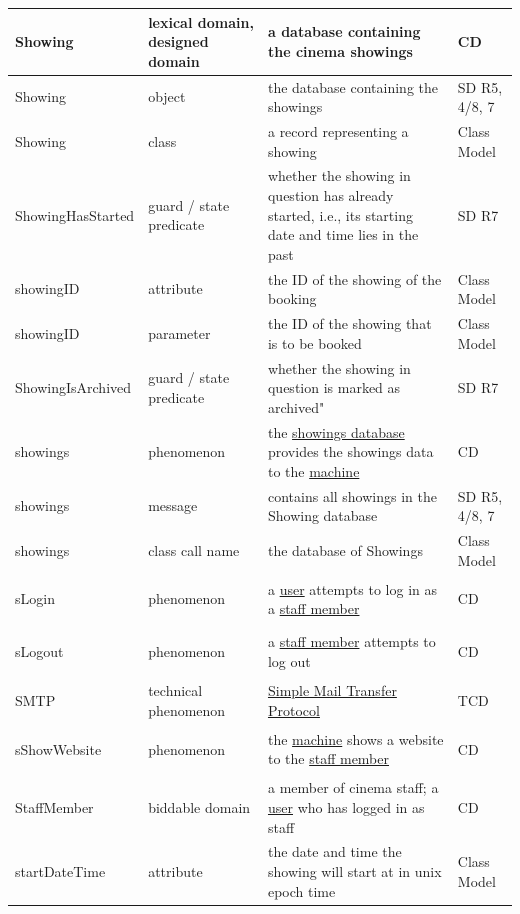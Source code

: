 \documentclass[a4paper,10pt,titlepage,bibtotoc,bibtotocnumbered]{scrreprt}
\begin{document}
\begin{longtable}{|p{4cm}|p{3cm}|p{5cm}|l|}
\hline
\hypertarget{glossary:Showing}{Showing} & lexical domain, designed domain & a database containing the cinema showings & CD\\
\hline
Showing & object & the database containing the showings & SD R5, 4/8, 7\\
\hline
Showing & class & a record representing a showing & Class Model\\
\hline
ShowingHasStarted & guard / state predicate & whether the showing in question has already started, i.e., its starting date and time lies in the past & SD R7\\
\hline
showingID & attribute & the ID of the showing of the booking & Class Model\\
\hline
showingID & parameter & the ID of the showing that is to be booked & Class Model\\
\hline
ShowingIsArchived & guard / state predicate & whether the showing in question is marked as archived" & SD R7\\
\hline
\hypertarget{glossary:showings}{showings} & phenomenon & the \hyperlink{glossary:Showing}{showings database} provides the showings data to the \hyperlink{glossary:UDEKino}{machine} & CD\\
\hline
showings & message & contains all showings in the Showing database & SD R5, 4/8, 7\\
\hline
showings & class call name & the database of Showings & Class Model\\
\hypertarget{glossary:sLogin}{sLogin} & phenomenon & a \hyperlink{glossary:User}{user} attempts to log in as a \hyperlink{glossary:StaffMember}{staff member} & CD\\
\hline
\hypertarget{glossary:sLogout}{sLogout} & phenomenon & a \hyperlink{glossary:StaffMember}{staff member} attempts to log out & CD\\
\hline
SMTP & technical phenomenon & \href{http://tools.ietf.org/html/rfc2821}{Simple Mail Transfer Protocol} & TCD\\
\hline
\hypertarget{glossary:sShowWebsite}{sShowWebsite} & phenomenon & the \hyperlink{glossary:UDEKino}{machine} shows a website to the \hyperlink{glossary:StaffMember}{staff member} & CD\\
\hline
\hypertarget{glossary:StaffMember}{StaffMember} & biddable domain & a member of cinema staff; a \hyperlink{glossary:User}{user} who has logged in as staff & CD\\
\hline
startDateTime & attribute & the date and time the showing will start at in unix epoch time & Class Model\\

\end{longtable}
\end{document}

